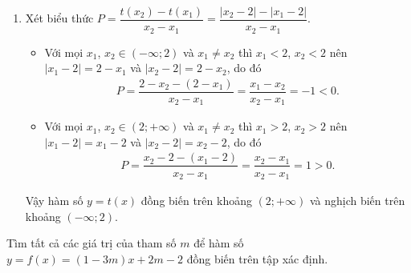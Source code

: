 \begin{vd}
{\begin{enumerate}
\begin{eqnarray*}
				P&=&\dfrac{h(x_2)-h(x_1)}{x_2-x_1}\\
				&=&\dfrac{\sqrt{4-3x_2}-\sqrt{4-3x_1}}{x_2-x_1}=\dfrac{4-3x_2-(4-3x_1)}{(x_2-x_1)(\sqrt{4-3x_2}+\sqrt{4-3x_1})}\\
				&=&-\dfrac{3}{\sqrt{4-3x_2}+\sqrt{4-3x_1}}<0.
			\end{eqnarray*}
			Vậy hàm số đã cho nghịch biến trên khoảng $\left(-\infty;\dfrac{4}{3}\right)$.
			\item Xét biểu thức $P=\dfrac{t(x_2)-t(x_1)}{x_2-x_1}=\dfrac{|x_2-2|-|x_1-2|}{x_2-x_1}$.
			\begin{itemize}
				\item Với mọi $x_1$, $x_2\in (-\infty;2)$ và $x_1\neq x_2$ thì $x_1<2$, $x_2<2$ nên $|x_1-2|=2-x_1$ và $|x_2-2|=2-x_2$, do đó
				\begin{align*}
					P=\dfrac{2-x_2-(2-x_1)}{x_2-x_1}=\dfrac{x_1-x_2}{x_2-x_1}=-1<0.
				\end{align*}
				\item Với mọi $x_1$, $x_2\in (2;+\infty)$ và $x_1\neq x_2$ thì $x_1>2$, $x_2>2$ nên $|x_1-2|=x_1-2$ và $|x_2-2|=x_2-2$, do đó
				\begin{align*}
					P=\dfrac{x_2-2-(x_1-2)}{x_2-x_1}=\dfrac{x_2-x_1}{x_2-x_1}=1>0.
				\end{align*}
			\end{itemize}
			Vậy hàm số $y=t(x)$ đồng biến trên khoảng $(2;+\infty)$ và nghịch biến trên khoảng $(-\infty;2)$.
		\end{enumerate}
	}
\end{vd}

\begin{vd}%
	Tìm tất cả các giá trị của tham số $m$ để hàm số $y=f(x)=(1-3m)x+2m-2$ đồng biến trên tập xác định.
\end{vd}

